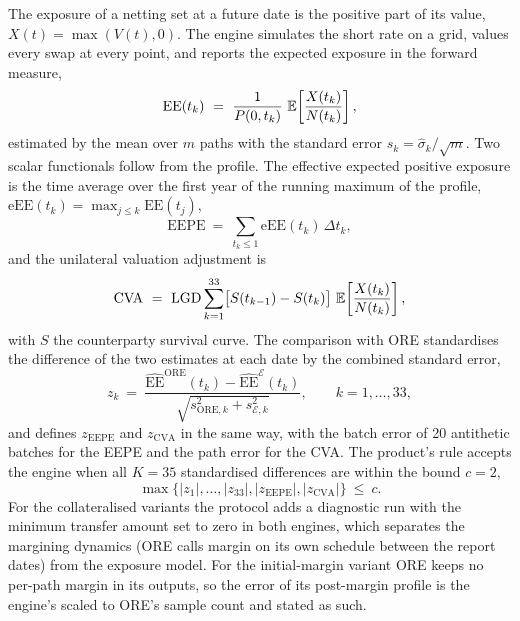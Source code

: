 The exposure of a netting set at a future date is the positive part of its value, $X(t)=\max(V(t),0)$. The engine simulates the short rate on a grid, values every swap at every point, and reports the expected exposure in the forward measure,
\begin{equation}
\mathrm{EE}(t_k)\ =\ \frac{1}{P(0,t_k)}\ \E\!\left[\frac{X(t_k)}{N(t_k)}\right],
\label{eq:ee}
\end{equation}
estimated by the mean over $m$ paths with the standard error $s_k=\hat{\sigma}_k/\sqrt{m}$. Two scalar functionals follow from the profile. The effective expected positive exposure is the time average over the first year of the running maximum of the profile, $\mathrm{eEE}(t_k)=\max_{j\le k}\mathrm{EE}(t_j)$,
\begin{equation}
\mathrm{EEPE}\ =\ \sum_{t_k\le 1}\mathrm{eEE}(t_k)\,\Delta t_k ,
\label{eq:eepe}
\end{equation}
and the unilateral valuation adjustment is
\begin{equation}
\mathrm{CVA}\ =\ \mathrm{LGD}\sum_{k=1}^{33}\bigl[S(t_{k-1})-S(t_k)\bigr]\ \E\!\left[\frac{X(t_k)}{N(t_k)}\right],
\label{eq:cva}
\end{equation}
with $S$ the counterparty survival curve. The comparison with ORE standardises the difference of the two estimates at each date by the combined standard error,
\begin{equation}
z_k\ =\ \frac{\widehat{\mathrm{EE}}^{\mathrm{ORE}}(t_k)-\widehat{\mathrm{EE}}^{\mathcal{E}}(t_k)}{\sqrt{s_{\mathrm{ORE},k}^{2}+s_{\mathcal{E},k}^{2}}},\qquad k=1,\dots,33,
\label{eq:z}
\end{equation}
and defines $z_{\mathrm{EEPE}}$ and $z_{\mathrm{CVA}}$ in the same way, with the batch error of 20 antithetic batches for the EEPE and the path error for the CVA. The product's rule accepts the engine when all $K=35$ standardised differences are within the bound $c=2$,
\begin{equation}
\max\bigl\{\lvert z_1\rvert,\dots,\lvert z_{33}\rvert,\lvert z_{\mathrm{EEPE}}\rvert,\lvert z_{\mathrm{CVA}}\rvert\bigr\}\ \le\ c .
\label{eq:rule}
\end{equation}
For the collateralised variants the protocol adds a diagnostic run with the minimum transfer amount set to zero in both engines, which separates the margining dynamics (ORE calls margin on its own schedule between the report dates) from the exposure model. For the initial-margin variant ORE keeps no per-path margin in its outputs, so the error of its post-margin profile is the engine's scaled to ORE's sample count and stated as such.

